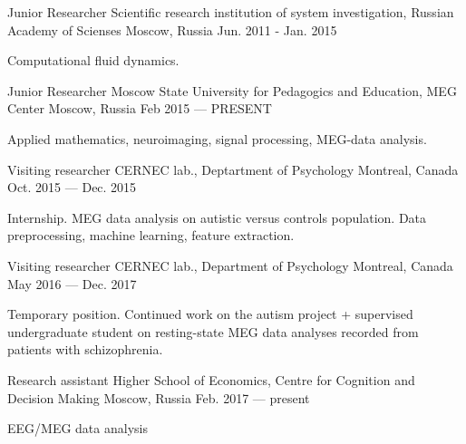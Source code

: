 
\begin{cventries}
  \cventry
    {Junior Researcher}
    {Scientific research institution of system investigation, Russian Academy of Scienses}
    {Moscow, Russia}
    {Jun. 2011 - Jan. 2015}
    {
      \begin{cvitems}
        \item {Computational fluid dynamics.}
      \end{cvitems}
    }
  \cventry
    {Junior Researcher}
    {Moscow State University for Pedagogics and Education, MEG Center}
    {Moscow, Russia}
    {Feb 2015 — PRESENT}
    {
      \begin{cvitems}
        \item {Applied mathematics, neuroimaging, signal processing, MEG-data analysis.}
      \end{cvitems}
    }
  \cventry
    {Visiting researcher}
    {CERNEC lab., Deptartment of Psychology}
    {Montreal, Canada}
    {Oct. 2015 — Dec. 2015}
    {
      \begin{cvitems}
        \item {Internship. MEG data analysis on autistic versus controls population. Data preprocessing, machine learning, feature extraction.}
      \end{cvitems} 
    }
  \cventry
    {Visiting researcher}
    {CERNEC lab., Department of Psychology}
    {Montreal, Canada}
    {May 2016 — Dec. 2017}
    {
      \begin{cvitems}
        \item{Temporary position. Continued work on the autism project + supervised undergraduate student on resting-state MEG data analyses recorded from patients with schizophrenia.}
      \end{cvitems}
    }
  \cventry
    {Research assistant}
    {Higher School of Economics, Centre for Cognition and Decision Making}
    {Moscow, Russia}
    {Feb. 2017 — present}
    {
      \begin{cvitems}
        \item{EEG/MEG data analysis}
      \end{cvitems}
    }
\end{cventries}
